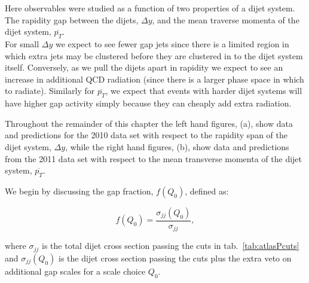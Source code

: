 	Here observables were studied
	as a function of two properties of a dijet system.  The rapidity gap between the dijets,
	$\Delta y$, and the mean traverse momenta of the dijet system, $\overline{p_T}$.\\
	For small $\Delta y$ we expect to see fewer gap jets since there is
	a limited region in which extra jets may be clustered before they are clustered in
	to the dijet system itself.   Conversely, as we pull the dijets apart in rapidity
	we expect to see an increase in additional QCD radiation (since there is a larger
	phase space in which to radiate).  Similarly for $\overline{p_T}$, we expect that
	events with harder dijet systems will have higher gap activity simply because they
	can cheaply add extra radiation.

	Throughout the remainder of this chapter the  left hand figures, (a), show data and
	predictions for the 2010 data set with respect to the rapidity span of the dijet
	system, $\Delta y$, while the right hand figures, (b), show data and predictions from the
	2011 data set with respect to the mean transverse momenta of the dijet system,
	$\overline{p_T}$.

	We begin by discussing the gap fraction, $f(Q_0)$, defined as:

	\begin{equation}
		f(Q_0) = \frac{\sigma_{jj}(Q_0)}{\sigma_{jj}},
	\end{equation}

	where $\sigma_{jj}$ is the total dijet cross section passing the cuts in
	tab.~\eqref{tab:atlasPcuts} and $\sigma_{jj}(Q_0)$ is the dijet cross section passing
	the cuts plus the extra veto on additional gap scales for a scale choice $Q_0$.

